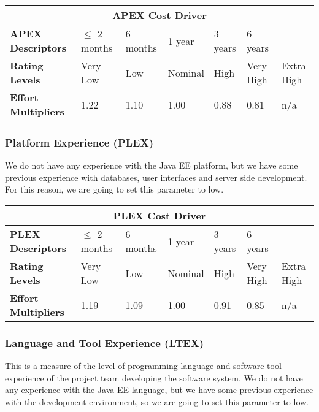 \begin{table}[H]
	\centering
	\begin{tabular}{| m{1.8cm} | m{2.2cm} | m{1.7cm} | m{1.5cm} | m{1.3cm} | m{1.3cm} | m{0.9cm} | }
		\hline
		\multicolumn{7}{|c|}{ \textbf{APEX Cost Driver} } \\
		\hline
		\hline
		\textbf{APEX Descriptors} & \(\leq\) 2 months & 6 months & 1 year & 3 years & 6 years & \\
		\hline
		\textbf{Rating Levels} & Very Low & Low & Nominal & High & Very High & Extra High \\
		\hline
		\textbf{Effort Multipliers} & 1.22 & 1.10 & 1.00 & 0.88 & 0.81 & n/a \\ 
		\hline
	\end{tabular}
\end{table}

\subsubsection*{Platform Experience (PLEX)}
We do not have any experience with the Java EE platform, but we have some previous experience with databases, user interfaces and server side development. For this reason, we are going to set this parameter to low.

\begin{table}[H]
	\centering
	\begin{tabular}{| m{1.8cm} | m{2.2cm} | m{1.7cm} | m{1.5cm} | m{1.3cm} | m{1.3cm} | m{0.9cm} | }
		\hline
		\multicolumn{7}{|c|}{ \textbf{PLEX Cost Driver} } \\
		\hline
		\hline
		\textbf{PLEX Descriptors} & \(\leq\) 2 months & 6 months & 1 year & 3 years & 6 years & \\
		\hline
		\textbf{Rating Levels} & Very Low & Low & Nominal & High & Very High & Extra High \\
		\hline
		\textbf{Effort Multipliers} & 1.19 & 1.09 & 1.00 & 0.91 & 0.85 & n/a \\ 
		\hline
	\end{tabular}
\end{table}
\newpage
\subsubsection*{Language and Tool Experience (LTEX)}
This is a measure of the level of programming language and software tool experience of the project team developing the software system. We do not have any experience with the Java EE language, but we have some previous experience with the development environment, so we are going to set this parameter to low.

